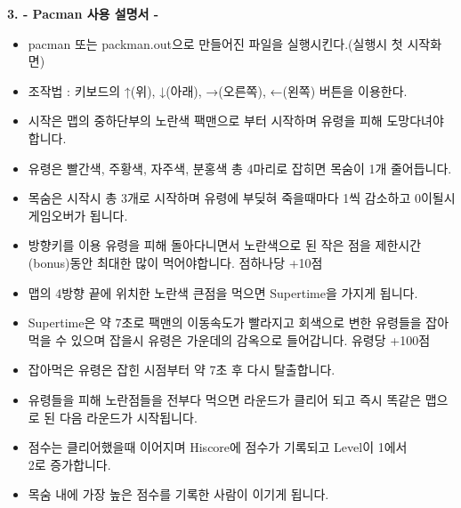 \documentclass{article}
\begin{document}
\newpage
\textbf{3. - Pacman 사용 설명서 -}
\begin{itemize}
\item pacman 또는 packman.out으로 만들어진 파일을 실행시킨다.(실행시 첫 시작화면)
\item 조작법 : 키보드의 ↑(위), ↓(아래), →(오른쪽), ←(왼쪽) 버튼을 이용한다.
\item 시작은 맵의 중하단부의 노란색 팩맨으로 부터 시작하며 유령을 피해 도망다녀야 합니다.
\item 유령은 빨간색, 주황색, 자주색, 분홍색 총 4마리로 잡히면 목숨이 1개 줄어듭니다.
\item 목숨은 시작시 총 3개로 시작하며 유령에 부딪혀 죽을때마다 1씩 감소하고 0이될시 게임오버가 됩니다.
\item 방향키를 이용 유령을 피해 돌아다니면서 노란색으로 된 작은 점을 제한시간(bonus)동안 최대한 많이 먹어야합니다. 점하나당 +10점
\item 맵의 4방향 끝에 위치한 노란색 큰점을 먹으면 Supertime을 가지게 됩니다.
\item Supertime은 약 7초로 팩맨의 이동속도가 빨라지고 회색으로 변한 유령들을 잡아먹을 수 있으며 잡을시 유령은 가운데의 감옥으로 들어갑니다. 유령당 +100점
\item 잡아먹은 유령은 잡힌 시점부터 약 7초 후 다시 탈출합니다.
\item 유령들을 피해 노란점들을 전부다 먹으면 라운드가 클리어 되고 즉시 똑같은 맵으로 된 다음 라운드가 시작됩니다.
\item 점수는 클리어했을때 이어지며 Hiscore에 점수가 기록되고 Level이 1에서\\ 2로 증가합니다.
\item 목숨 내에 가장 높은 점수를 기록한 사람이 이기게 됩니다.
\end{itemize}
\end{document}
